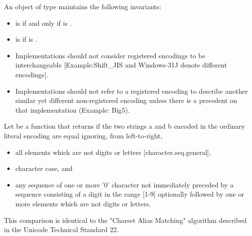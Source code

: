 \documentclass{wg21}
\begin{document}
\begin{addedblock}
An object  of type  maintains the following invariants:
\begin{itemize}
\item {} is  if and only if  is .
\item {} is  if  is .
\end{itemize}

\recommended
\begin{itemize}
\item Implementations should not consider registered encodings to be interchangeable [Example:Shift_JIS and Windows-31J denote different encodings].
\item Implementations should not refer to a registered encoding to describe another similar yet different non-registered encoding unless there is a precedent on that implementation (Example: Big5).
\end{itemize}


\pnum Let  be a function that returns  if the two strings a and b encoded in the ordinary literal encoding are equal ignoring, from left-to-right,
\begin{itemize}
    \item all elements which are not digits or letters [character.seq.general],
    \item character case, and
    \item any sequence of one or more '0' character not immediately preceded by a sequence consisting of a digit in the range [1-9] optionally followed by one or more elements which are not digits or letters.
\end{itemize}

\begin{note}
    This comparison is identical to the "Charset Alias Matching" algorithm described in the Unicode Technical Standard 22.
\end{note}


\end{addedblock}
\end{document}
